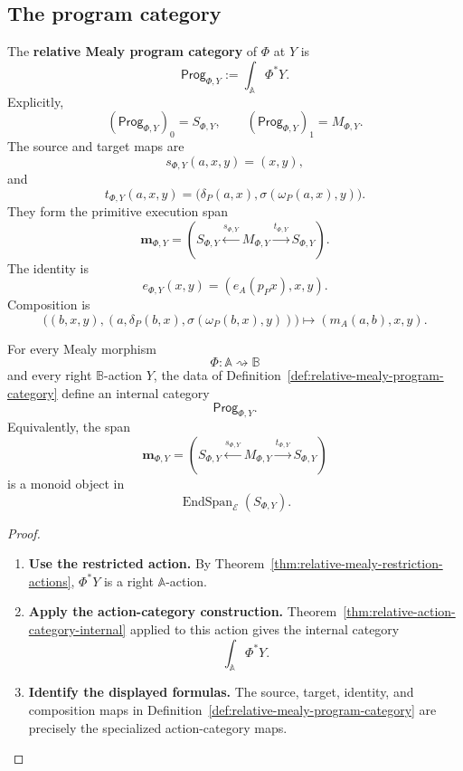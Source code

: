 \subsection{The program category}
\label{subsec:relative-program-category-definition}

\begin{definition}
\label{def:relative-mealy-program-category}
The \textbf{relative Mealy program category} of \(\Phi\) at \(Y\) is
\[
\mathsf{Prog}_{\Phi,Y}
:=
\int_{\mathbb A}\Phi^\ast Y.
\]
Explicitly,
\[
(\mathsf{Prog}_{\Phi,Y})_0=S_{\Phi,Y},
\qquad
(\mathsf{Prog}_{\Phi,Y})_1=M_{\Phi,Y}.
\]
The source and target maps are
\[
s_{\Phi,Y}(a,x,y)=(x,y),
\]
and
\[
t_{\Phi,Y}(a,x,y)
=
\bigl(
\delta_P(a,x),
\sigma(\omega_P(a,x),y)
\bigr).
\]
They form the primitive execution span
\[
\mathbf m_{\Phi,Y}
=
\left(
S_{\Phi,Y}
\xleftarrow{s_{\Phi,Y}}
M_{\Phi,Y}
\xrightarrow{t_{\Phi,Y}}
S_{\Phi,Y}
\right).
\]
The identity is
\[
e_{\Phi,Y}(x,y)=(e_A(p_Px),x,y).
\]
Composition is
\[
\bigl(
(b,x,y),
(a,\delta_P(b,x),\sigma(\omega_P(b,x),y))
\bigr)
\longmapsto
(m_A(a,b),x,y).
\]
\end{definition}

\begin{theorem}
\label{thm:relative-program-categories}
For every Mealy morphism
\[
\Phi:\mathbb A\rightsquigarrow\mathbb B
\]
and every right \(\mathbb B\)-action \(Y\), the data of
Definition~\ref{def:relative-mealy-program-category} define an internal
category
\[
\mathsf{Prog}_{\Phi,Y}.
\]
Equivalently, the span
\[
\mathbf m_{\Phi,Y}
=
\left(
S_{\Phi,Y}
\xleftarrow{s_{\Phi,Y}}
M_{\Phi,Y}
\xrightarrow{t_{\Phi,Y}}
S_{\Phi,Y}
\right)
\]
is a monoid object in
\[
\operatorname{EndSpan}_{\mathcal E}(S_{\Phi,Y}).
\]
\end{theorem}

\begin{proof}
\leavevmode
\begin{enumerate}
\item \textbf{Use the restricted action.}
By Theorem~\ref{thm:relative-mealy-restriction-actions},
\(\Phi^\ast Y\) is a right \(\mathbb A\)-action.

\item \textbf{Apply the action-category construction.}
Theorem~\ref{thm:relative-action-category-internal} applied to this action
gives the internal category
\[
\int_{\mathbb A}\Phi^\ast Y.
\]

\item \textbf{Identify the displayed formulas.}
The source, target, identity, and composition maps in
Definition~\ref{def:relative-mealy-program-category} are precisely the
specialized action-category maps.
\end{enumerate}
\end{proof}

